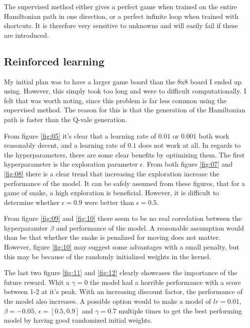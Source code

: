 \documentclass[%
 uio,
 jmp,
 amsmath,amssymb,
 reprint, nofootinbib]{revtex4-1}
\numberwithin{equation}{section}
\begin{document}
The supervised method either gives a perfect game when trained on the entire Hamiltonian path in one direction, or a perfect infinite loop when trained with shortcuts. It is therefore very sensitive to unknowns and will easily fail if these are introduced.

\subsection{Reinforced learning}

My initial plan was to have a larger game board than the 8x8 board I ended up using. However, this simply took too long and were to difficult computationally. I felt that was worth noting, since this problem is far less common using the supervised method. The reason for this is that the generation of the Hamiltonian path is faster than the Q-vale generation.

From figure \ref{fig:05} it's clear that a learning rate of \(0.01\) or \(0.001\) both work reasonably decent, and a learning rate of \(0.1\) does not work at all. In regards to the hyperparameters, there are some clear benefits by optimizing them. The first hyperparameter is the exploration parameter \(\epsilon\). From both figure \ref{fig:07} and \ref{fig:08} there is a clear trend that increasing the exploration increase the performance of the model. It can be safely assumed from these figures, that for a game of snake, a high exploration is beneficial. However, it is difficult to determine whether \(\epsilon=0.9\) were better than \(\epsilon = 0.5\). 

From figure \ref{fig:09} and \ref{fig:10} there seem to be no real correlation between the hyperparamter \(\beta\) and performance of the model. A reasonable assumption would than be that whether the snake is penalized for moving does not matter. However, figure \ref{fig:10} may suggest some advantages with a small penalty, but this may be because of the randomly initialized weights in the kernel.

The last two figure \ref{fig:11} and \ref{fig:12} clearly showcases the importance of the future reward. Whit a \(\gamma=0\) the model had a horrible performance with a score between 1-2 at it's peak. With an increasing discount factor, the performance of the model also increases. A possible option would to make a model of \(lr = 0.01\), \(\beta = -0.05\), \(\epsilon = [0.5, 0.9]\) and \(\gamma = 0.7\) multiple times to get the best performing model by having good randomized initial weights.
\end{document}
